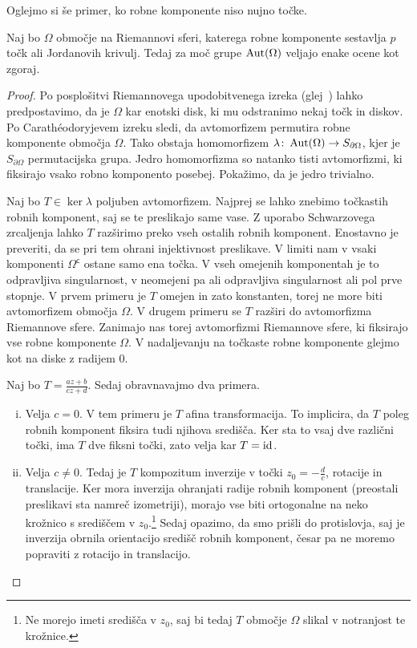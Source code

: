 Oglejmo si še primer, ko robne komponente niso nujno točke.

\begin{izrek}[Heins]
Naj bo $\Omega$ območje na Riemannovi sferi, katerega robne
komponente sestavlja $p$ točk ali Jordanovih krivulj. Tedaj za
moč grupe $\operatorname{Aut}(\Omega)$ veljajo enake ocene kot zgoraj.
\end{izrek}

\begin{proof}
Po posplošitvi Riemannovega upodobitvenega izreka
(glej~\cite{Koebe_uni}) lahko predpostavimo, da je $\Omega$ kar
enotski disk, ki mu odstranimo nekaj točk in diskov. Po
Carathéodoryjevem izreku sledi, da avtomorfizem permutira robne
komponente območja $\Omega$. Tako obstaja homomorfizem
$\lambda \colon \operatorname{Aut}(\Omega) \to S_{\partial \Omega}$, kjer je
$S_{\partial{\Omega}}$ permutacijska grupa. Jedro homomorfizma so
natanko tisti avtomorfizmi, ki fiksirajo vsako robno komponento
posebej. Pokažimo, da je jedro trivialno.

Naj bo $T \in \ker \lambda$ poljuben avtomorfizem. Najprej se lahko
znebimo točkastih robnih komponent, saj se te preslikajo same vase.
Z uporabo Schwarzovega zrcaljenja lahko $T$ razširimo preko vseh
ostalih robnih komponent. Enostavno je preveriti, da se pri tem
ohrani injektivnost preslikave. V limiti nam v vsaki komponenti
$\Omega^\mathsf{c}$ ostane samo ena točka. V vseh omejenih
komponentah je to odpravljiva singularnost, v neomejeni pa ali
odpravljiva singularnost ali pol prve stopnje. V prvem primeru je
$T$ omejen in zato konstanten, torej ne more biti avtomorfizem
območja $\Omega$. V drugem primeru se $T$ razširi do avtomorfizma
Riemannove sfere. Zanimajo nas torej avtomorfizmi Riemannove sfere,
ki fiksirajo vse robne komponente $\Omega$. V nadaljevanju na
točkaste robne komponente glejmo kot na diske z radijem $0$.

Naj bo $T = \frac{az + b}{cz + d}$. Sedaj obravnavajmo dva primera.

\begin{enumerate}[i)]
\item Velja $c=0$. V tem primeru je $T$ afina transformacija. To
implicira, da $T$ poleg robnih komponent fiksira tudi njihova
središča. Ker sta to vsaj dve različni točki, ima $T$ dve fiksni
točki, zato velja kar $T = \operatorname{id}$.

\item Velja $c \ne 0$. Tedaj je $T$ kompozitum inverzije v točki
$z_0 = -\frac{d}{c}$, rotacije in translacije. Ker mora inverzija
ohranjati radije robnih komponent (preostali preslikavi sta namreč
izometriji), morajo vse biti ortogonalne na neko krožnico s
središčem v $z_0$.\footnote{Ne morejo imeti središča v $z_0$, saj
bi tedaj $T$ območje $\Omega$ slikal v notranjost te krožnice.}
Sedaj opazimo, da smo prišli do protislovja, saj je inverzija
obrnila orientacijo središč robnih komponent, česar pa ne moremo
popraviti z rotacijo in translacijo.
\end{enumerate}


\end{proof}
